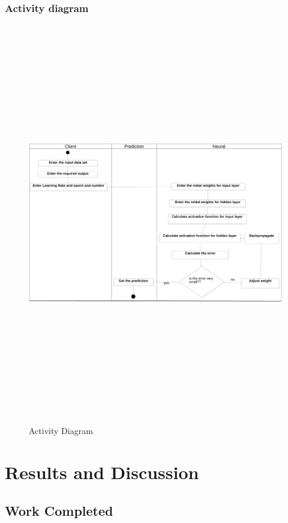 \subsection{Activity diagram}
\begin{figure}[H]
\begin{center}
    
\includegraphics[width=160mm,height=175mm]{images/activity.png}
 \caption{Activity Diagram}
 \end{center}                
\end{figure}


\chapter{Results and Discussion}

\section{Work Completed}
  

